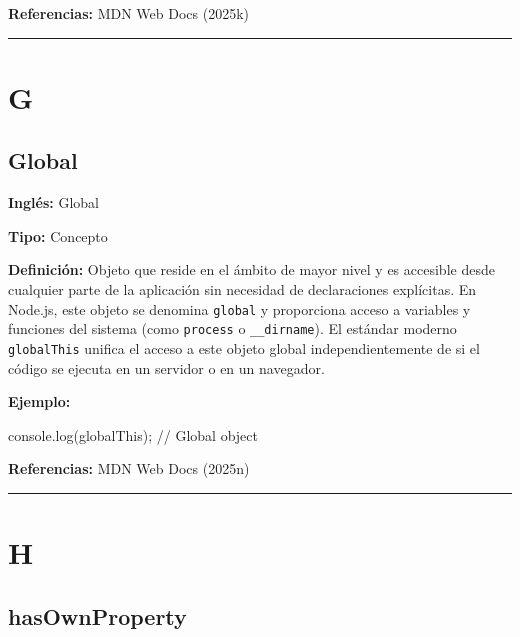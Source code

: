 \documentclass[
  letterpaper,
  DIV=11,
  numbers=noendperiod]{scrreprt}
\newenvironment{Shaded}{\begin{snugshade}}{\end{snugshade}}
\newcommand{\BuiltInTok}[1]{\textcolor[rgb]{0.00,0.23,0.31}{#1}}
\newcommand{\CommentTok}[1]{\textcolor[rgb]{0.37,0.37,0.37}{#1}}
\newcommand{\FunctionTok}[1]{\textcolor[rgb]{0.28,0.35,0.67}{#1}}
\newcommand{\NormalTok}[1]{\textcolor[rgb]{0.00,0.23,0.31}{#1}}
\newcommand{\OperatorTok}[1]{\textcolor[rgb]{0.37,0.37,0.37}{#1}}
\let\oldsubsection\subsection
\renewcommand{\subsection}{\phantomsection\oldsubsection}
\begin{document}
\textbf{Referencias:} MDN Web Docs (2025k)

\begin{center}\rule{0.5\linewidth}{0.5pt}\end{center}

\section*{G}\label{g}


\subsection*{Global}\label{glos-global}

\textbf{Inglés:} Global

\textbf{Tipo:} Concepto

\textbf{Definición:} Objeto que reside en el ámbito de mayor nivel y es
accesible desde cualquier parte de la aplicación sin necesidad de
declaraciones explícitas. En Node.js, este objeto se denomina
\texttt{global} y proporciona acceso a variables y funciones del sistema
(como \texttt{process} o \texttt{\_\_dirname}). El estándar moderno
\texttt{globalThis} unifica el acceso a este objeto global
independientemente de si el código se ejecuta en un servidor o en un
navegador.

\textbf{Ejemplo:}

\begin{Shaded}
\begin{Highlighting}[]
\BuiltInTok{console}\OperatorTok{.}\FunctionTok{log}\NormalTok{(globalThis)}\OperatorTok{;} \CommentTok{// Global object}
\end{Highlighting}
\end{Shaded}

\textbf{Referencias:} MDN Web Docs (2025n)

\begin{center}\rule{0.5\linewidth}{0.5pt}\end{center}

\section*{H}\label{h}


\subsection*{hasOwnProperty}\label{glos-hasownproperty}
\end{document}
